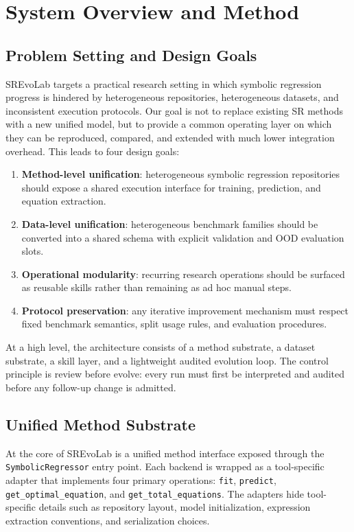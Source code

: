 \section{System Overview and Method}

\subsection{Problem Setting and Design Goals}

SREvoLab targets a practical research setting in which symbolic regression progress is hindered by heterogeneous repositories, heterogeneous datasets, and inconsistent execution protocols. Our goal is not to replace existing SR methods with a new unified model, but to provide a common operating layer on which they can be reproduced, compared, and extended with much lower integration overhead. This leads to four design goals:
\begin{enumerate}[leftmargin=1.5em]
    \item \textbf{Method-level unification}: heterogeneous symbolic regression repositories should expose a shared execution interface for training, prediction, and equation extraction.
    \item \textbf{Data-level unification}: heterogeneous benchmark families should be converted into a shared schema with explicit validation and OOD evaluation slots.
    \item \textbf{Operational modularity}: recurring research operations should be surfaced as reusable skills rather than remaining as ad hoc manual steps.
    \item \textbf{Protocol preservation}: any iterative improvement mechanism must respect fixed benchmark semantics, split usage rules, and evaluation procedures.
\end{enumerate}

At a high level, the architecture consists of a method substrate, a dataset substrate, a skill layer, and a lightweight audited evolution loop. The control principle is review before evolve: every run must first be interpreted and audited before any follow-up change is admitted.

\subsection{Unified Method Substrate}

At the core of SREvoLab is a unified method interface exposed through the \texttt{SymbolicRegressor} entry point. Each backend is wrapped as a tool-specific adapter that implements four primary operations: \texttt{fit}, \texttt{predict}, \texttt{get\_optimal\_equation}, and \texttt{get\_total\_equations}. The adapters hide tool-specific details such as repository layout, model initialization, expression extraction conventions, and serialization choices.

